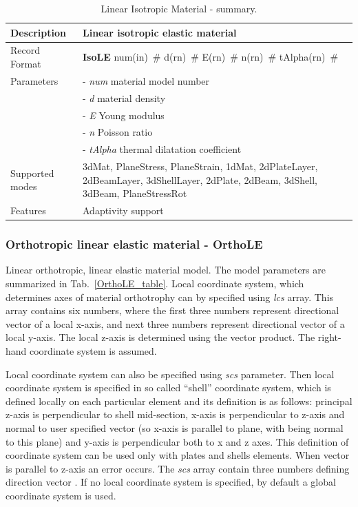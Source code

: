 \documentclass[a4paper]{article}
\newcommand{\descitem}[1]{{\noindent \bf #1}}
\newcommand{\elemparam}[2]{{{#1\tiny (#2)}~\#}}
\newcommand{\param}[1]{{\it #1}}
\begin{document}
\begin{table}[!htb]
\begin{tabular}{|l|p{9cm}|}
\hline
Description & Linear isotropic elastic material\\
\hline
Record Format & \descitem{IsoLE} \elemparam{num}{in}
\elemparam{d}{rn} \elemparam{E}{rn} \elemparam{n}{rn}
\elemparam{tAlpha}{rn}\\
Parameters &- \param{num} material model number\\
&- \param{d} material density\\
&- \param{E} Young modulus\\
&- \param{n} Poisson ratio\\
&- \param{tAlpha} thermal dilatation coefficient\\
Supported modes& 3dMat, PlaneStress, PlaneStrain, 1dMat,
2dPlateLayer, 2dBeamLayer, 3dShellLayer, 2dPlate, 2dBeam, 3dShell,
3dBeam, PlaneStressRot\\
Features & Adaptivity support\\
\hline
\end{tabular}
\caption{Linear Isotropic Material - summary.}
\label{IsoLE_table}
\end{table}



\subsubsection{Orthotropic linear elastic material - OrthoLE}
\label{OrthoLE}
Linear orthotropic, linear elastic  material model. The model parameters are summarized
in Tab.~\ref{OrthoLE_table}.
Local coordinate system, which determines axes of material orthotrophy
can by specified using \param{lcs} array. This array contains six numbers,
where the first three numbers represent directional vector of a local x-axis,
and next three numbers represent directional vector of a local y-axis.
The local z-axis is determined using the vector product.
The right-hand coordinate system is assumed.

Local coordinate system
can also be specified using \param{scs} parameter. Then local coordinate
system is specified in so called ``shell''
coordinate system, which is defined locally on each particular element
and its definition is as follows: principal z-axis is perpendicular to
shell mid-section, x-axis is perpendicular to z-axis and normal to
user specified vector (so x-axis is parallel to plane, with  being
normal to this plane) and y-axis is perpendicular both to x and z
axes. This definition of coordinate system can be used only with plates
and shells elements.
When vector  is parallel to z-axis an error occurs. The \param{scs} array contain three numbers
defining direction vector . If no local coordinate system is
specified, by default a global coordinate system is used.
\end{document}
